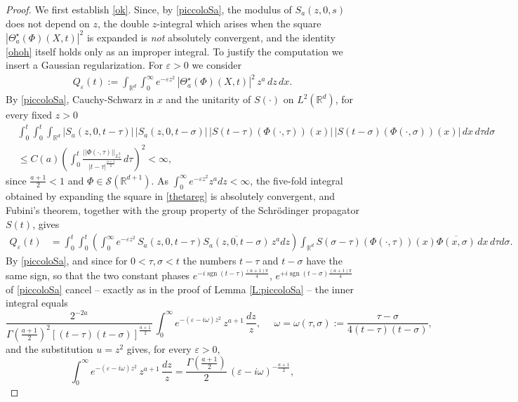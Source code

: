 \documentclass[11pt,letter]{amsart}
\def \R {\mathbb{R}}
\newcommand{\Rd}{\mathbb R^d}
\numberwithin{equation}{section}
\newcommand{\ve}{\varepsilon}
\numberwithin{equation}{section}
\begin{document}
\begin{proof}

We first establish \eqref{ok}. Since, by \eqref{piccoloSa}, the modulus of $S_a(z,0,s)$ does not depend on $z$, the double $z$-integral which arises when the square $|\Theta_a^\star(\Phi)(X,t)|^2$ is expanded is \emph{not} absolutely convergent, and the identity \eqref{ohoh} itself holds only as an improper integral. To justify the computation we insert a Gaussian regularization. For $\ve>0$ we consider
\begin{align}\label{thetareg}
Q_\ve(t) := \int_{\Rd} \int_0^\infty e^{-\ve z^2}\, |\Theta_a^\star(\Phi)(X,t)|^2\, z^a\, dz\, dx.
\end{align}
By \eqref{piccoloSa}, Cauchy-Schwarz in $x$ and the unitarity of $S(\cdot)$ on $L^2(\Rd)$, for every fixed $z>0$
\begin{align*}
& \int_0^t \int_0^t \int_{\Rd} |S_a(z,0,t-\tau)|\, |S_a(z,0,t-\sigma)|\, |S(t-\tau)(\Phi(\cdot,\tau))(x)|\, |S(t-\sigma)(\Phi(\cdot,\sigma))(x)|\, dx\, d\tau d\sigma
\\
& \le C(a) \left(\int_0^t \frac{||\Phi(\cdot,\tau)||_{L^2_x}}{|t-\tau|^{\frac{a+1}2}}\, d\tau\right)^2 < \infty,
\end{align*}
since $\frac{a+1}2<1$ and $\Phi\in \mathscr S(\R^{d+1})$. As $\int_0^\infty e^{-\ve z^2} z^a dz<\infty$, the five-fold integral obtained by expanding the square in \eqref{thetareg} is absolutely convergent, and Fubini's theorem, together with the group property of the Schr\"odinger propagator $S(t)$, gives
\begin{align*}
Q_\ve(t)
& = \int_0^t \int_0^t \left(\int_0^\infty e^{-\ve z^2}\, S_a(z,0,t-\tau)\overline{S_a(z,0,t-\sigma)}\, z^a dz\right) \int_{\Rd} S(\sigma-\tau)(\Phi(\cdot,\tau))(x) \overline{\Phi(x,\sigma)}\, dx\, d\tau d\sigma.
\end{align*}
By \eqref{piccoloSa}, and since for $0<\tau, \sigma<t$ the numbers $t-\tau$ and $t-\sigma$ have the same sign, so that the two constant phases $e^{-i\operatorname{sgn}(t-\tau)\frac{(a+1)\pi}4}$, $e^{+i\operatorname{sgn}(t-\sigma)\frac{(a+1)\pi}4}$ of \eqref{piccoloSa} cancel -- exactly as in the proof of Lemma \ref{L:piccoloSa} -- the inner integral equals
\[
\frac{2^{-2a}}{\Gamma\!\left(\frac{a+1}2\right)^2 \left[(t-\tau)(t-\sigma)\right]^{\frac{a+1}2}}\, \int_0^\infty e^{-(\ve - i \omega) z^2}\, z^{a+1}\, \frac{dz}z,\ \ \ \ \ \ \omega = \omega(\tau,\sigma) := \frac{\tau-\sigma}{4(t-\tau)(t-\sigma)},
\]
and the substitution $u = z^2$ gives, for every $\ve>0$,
\[
\int_0^\infty e^{-(\ve-i\omega)z^2}\, z^{a+1}\, \frac{dz}z = \frac{\Gamma(\frac{a+1}2)}{2}\, (\ve - i \omega)^{-\frac{a+1}2},
\]
\end{proof}
\end{document}
